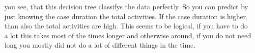 you see, that this decision tree classifys the data perfectly. So you can
predict by just knowing the case duration the total activities. If the case
duration is higher, than also the total activities are high. This seems to be
logical, if you have to do a lot this takes most of the times longer and
otherwise around, if you do not need long you mostly did not do a lot of
different things in the time.